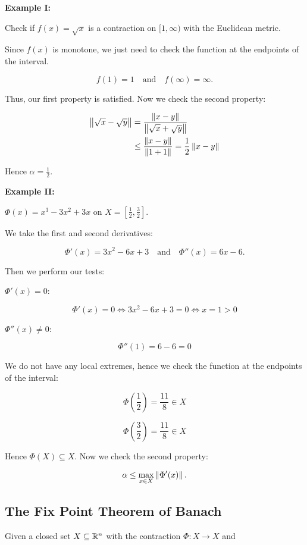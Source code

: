 \textbf{Example I:}

Check if \(f(x) = \sqrt{x}\) is a contraction on \([1,\infty)\) with the Euclidean metric. 

Since \(f(x)\) is monotone, we just need to check the function at the endpoints of the interval.

\[
    f(1) = 1 \quad \text{and} \quad f(\infty) = \infty.
\]

Thus, our first property is satisfied. Now we check the second property:

\begin{align*}
    \left\| \sqrt{x} - \sqrt{y} \right\| &= \frac{\left\| x - y \right\|}{\left\| \sqrt{x} + \sqrt{y} \right\|} \\ 
    &\le \frac{\left\| x - y \right\|}{\left\| 1 + 1 \right\|} = \frac{1}{2} \left\| x - y \right\|
\end{align*}

Hence \(\alpha = \frac{1}{2}\).

\textbf{Example II:}

\(\Phi(x) = x^3 -3x^2 + 3x\) on \(X = [\frac{1}{2}, \frac{3}{2}]\).

We take the first and second derivatives: 

\[
    \Phi'(x) = 3x^2 - 6x + 3 \quad \text{and} \quad \Phi''(x) = 6x - 6.
\]

Then we perform our tests:

\(\Phi'(x) = 0\):

\[
    \Phi'(x) = 0 \iff 3x^2 - 6x + 3 = 0 \iff x = 1 > 0
\]

\(\Phi''(x) \ne 0\):

\[
    \Phi''(1) = 6 - 6 = 0
\]

We do not have any local extremes, hence we check the function at the endpoints of the interval:

\[
    \Phi\left(\frac{1}{2}\right) = \frac{11}{8} \in X
\]

\[
    \Phi\left(\frac{3}{2}\right) = \frac{11}{8} \in X
\]

Hence \(\Phi(X) \subseteq X\). Now we check the second property:

\[
    \alpha \le \max_{x \in X} \left\| \Phi'(x) \right\|.
\]

\subsection{The Fix Point Theorem of Banach}

Given a closed set \(X \subseteq \mathbb{R}^n\) with the contraction \(\Phi : X \to X\) and 


